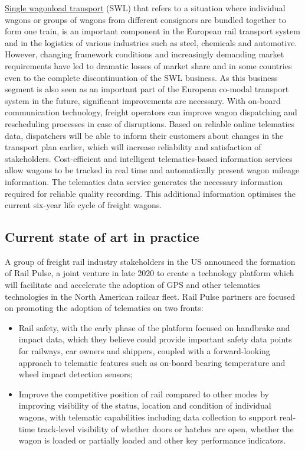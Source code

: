 \documentclass[
]{book}
\providecommand{\tightlist}{%
  \setlength{\itemsep}{0pt}\setlength{\parskip}{0pt}}
\begin{document}
\href{https://blog.railcargo.com/de/artikel/einzelwagenverkehr}{Single wagonload transport} (SWL) that refers to a situation where individual wagons or groups of wagons from different consignors are bundled together to form one train, is an important component in the European rail transport system and in the logistics of various industries such as steel, chemicals and automotive. However, changing framework conditions and increasingly demanding market requirements have led to dramatic losses of market share and in some countries even to the complete discontinuation of the SWL business. As this business segment is also seen as an important part of the European co-modal transport system in the future, significant improvements are necessary.
With on-board communication technology, freight operators can improve wagon dispatching and rescheduling processes in case of disruptions. Based on reliable online telematics data, dispatchers will be able to inform their customers about changes in the transport plan earlier, which will increase reliability and satisfaction of stakeholders.
Cost-efficient and intelligent telematics-based information services allow wagons to be tracked in real time and automatically present wagon mileage information. The telematics data service generates the necessary information required for reliable quality recording. This additional information optimises the current six-year life cycle of freight wagons.

\hypertarget{current-state-of-art-in-practice-25}{%
\subsection*{Current state of art in practice}\label{current-state-of-art-in-practice-25}}

A group of freight rail industry stakeholders in the US announced the formation of Rail Pulse, a joint venture in late 2020 to create a technology platform which will facilitate and accelerate the adoption of GPS and other telematics technologies in the North American railcar fleet. Rail Pulse partners are focused on promoting the adoption of telematics on two fronts:

\begin{itemize}
\tightlist
\item
  Rail safety, with the early phase of the platform focused on handbrake and impact data, which they believe could provide important safety data points for railways, car owners and shippers, coupled with a forward-looking approach to telematic features such as on-board bearing temperature and wheel impact detection sensors;
\item
  Improve the competitive position of rail compared to other modes by improving visibility of the status, location and condition of individual wagons, with telematic capabilities including data collection to support real-time track-level visibility of whether doors or hatches are open, whether the wagon is loaded or partially loaded and other key performance indicators.
\end{itemize}
\end{document}
